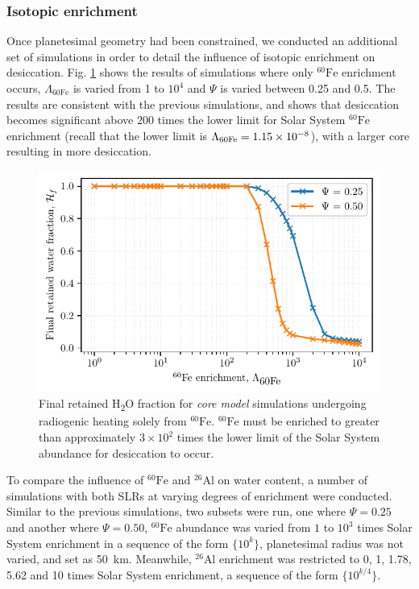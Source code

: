 \documentclass[fleqn,usenatbib]{mnras}
\newcommand{\rms}[1]{\ensuremath{_{\text{#1}}}}
\newcommand{\tsu}[1]{\textsubscript{#1}}
\newcommand{\atom}[2]{$^{#2}\text{#1}$}
\newcommand{\al}{\atom{Al}{26}}
\newcommand{\fe}{\atom{Fe}{60}}
\newcommand{\water}{{H\tsu{2}O}}
\begin{document}
\subsubsection{Isotopic enrichment}
\label{sec:core-isotopic}

Once planetesimal geometry had been constrained, we conducted an additional set of simulations in order to detail the influence of isotopic enrichment on desiccation.
Fig. \ref{fig:pure-iron} shows the results of simulations where only \fe{} enrichment occurs, $\Lambda\rms{60Fe}$ is varied from 1 to $10^4$ and $\Psi$ is varied between 0.25 and 0.5.
The results are consistent with the previous simulations, and shows that desiccation becomes significant above $200$ times the lower limit for Solar System \fe{} enrichment (recall that the lower limit is $\Lambda_{\rm 60Fe} = 1.15 \times 10^{-8}$), with a larger core resulting in more desiccation.

\begin{figure}
  \centering
  \includegraphics[scale=0.7]{assets/core-model-mix/pure-iron.pdf}
  \caption{Final retained \water{} fraction for \emph{core model} simulations undergoing radiogenic heating solely from \fe{}. \fe{} must be enriched to greater than approximately $3 \times 10^2$ times the lower limit of the Solar System abundance for desiccation to occur.}
  \label{fig:pure-iron}
\end{figure}

To compare the influence of \fe{} and \al{} on water content, a number of simulations with both SLRs at varying degrees of enrichment were conducted.
Similar to the previous simulations, two subsets were run, one where $\Psi = 0.25$ and another where $\Psi = 0.50$, \fe{} abundance was varied from $1$ to $10^3$ times Solar System enrichment in a sequence of the form $\{10^k\}$, planetesimal radius was not varied, and set as \SI{50}{km}.
Meanwhile, \al{} enrichment was restricted to 0, 1, 1.78, 5.62 and 10 times Solar System enrichment, a sequence of the form $\{10^{k/4}\}$.
\end{document}
